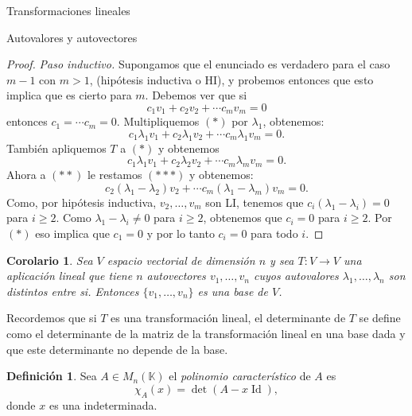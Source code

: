 \documentclass[a4paper,12pt,twoside,spanish,reqno]{amsbook}
\numberwithin{equation}{section}
\newtheorem{corolario}[teorema]{Corolario}
\theoremstyle{definition}
\newtheorem{definicion}[teorema]{Definici\'on}
\theoremstyle{remark}
\newcommand{\Id}{\operatorname{Id}}
\newcommand{\K}{\mathbb K}
\begin{document}
\begin{chapter}{Transformaciones lineales}
\begin{section}{Autovalores y autovectores}
\begin{proof}
            \textit{Paso inductivo.} Supongamos que el enunciado es verdadero para el caso $m-1$ con $m>1$, (hipótesis inductiva o HI), y probemos entonces que esto implica que es cierto para $m$. Debemos ver  que si 
            \begin{equation}
            c_1v_1+	c_2v_2+ \cdots c_mv_m = 0 \tag{$*$}
            \end{equation}
            entonces $c_1 = \cdots c_m = 0$.
            Multipliquemos $(*)$ por $\lambda_1$, obtenemos:
            \begin{equation}
            c_1\lambda_1v_1+ c_2\lambda_1v_2+\cdots c_m\lambda_1v_m = 0. \tag{$**$}
            \end{equation}
            También apliquemos $T$ a $(*)$ y obtenemos
            \begin{equation}
            c_1\lambda_1v_1+ c_2\lambda_2v_2+\cdots c_m\lambda_mv_m = 0. \tag{$***$}
            \end{equation}
            Ahora a $(**)$ le restamos $(***)$ y obtenemos:
            \begin{equation}
            c_2(\lambda_1 -\lambda_2)v_2+\cdots c_m(\lambda_1 -\lambda_m)v_m = 0. 	 
            \end{equation}
            Como, por hipótesis inductiva, $v_2,\ldots,v_m$ son LI, tenemos que $c_i(\lambda_1 -\lambda_i)=0$ para $i\ge 2$. Como $\lambda_1 -\lambda_i \ne 0$ para $i\ge 2$, obtenemos que $c_i = 0$ para $i\ge 2$. Por $(*)$ eso implica que $c_1=0$ y por lo tanto $c_i=0$ para todo $i$.
        \end{proof}
        
        \begin{corolario}\label{cor-aut-li}
            Sea $V$ espacio vectorial de dimensión $n$ y sea $T: V \to V$ una aplicación lineal que tiene $n$
            autovectores $v_1,\ldots, v_n$ cuyos autovalores $\lambda_1,\ldots,\lambda_n$ son distintos entre
            si. Entonces $\{v_1,\ldots, v_n\}$ es una base de $V$.
        \end{corolario}
        
        Recordemos que si $T$  es una transformación lineal, el determinante de $T$  se define como el determinante de la matriz de la transformación lineal en una base dada y que este determinante no depende de la base.    
        
        \begin{definicion}
            Sea $A \in M_n(\K)$   el \textit{polinomio característico} de $A$ es $$\chi_A(x) = \det(A-x \Id),$$ donde $x$ es una indeterminada. 
            

\end{definicion}
\end{section}
\end{chapter}
\end{document}
